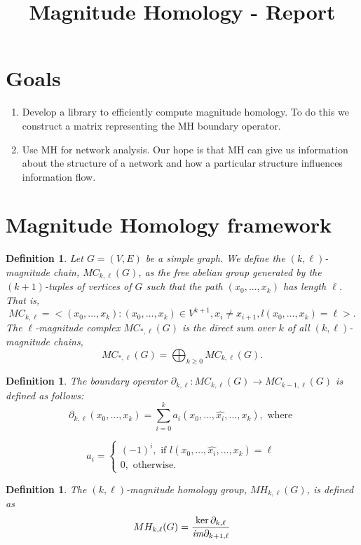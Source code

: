 \documentclass{article}
\title{Magnitude Homology - Report}
\newtheorem{definition}[theorem]{Definition}
\newcommand{\boundary}{\partial_{k,\ell}}
\newcommand{\im}{\emph{im}}
\begin{document}
	
	\maketitle
	
	\section{Goals}
	\begin{enumerate}
		\item Develop a library to efficiently compute magnitude homology. To do this we construct a matrix representing the MH boundary operator.
		\item Use MH for network analysis. Our hope is that MH can give us information about the structure of a network and how a particular structure influences information flow.
	\end{enumerate}
	
	\section{Magnitude Homology framework}
	\begin{definition}
		Let $G=(V,E)$ be a simple graph. We define the \emph{$(k,\ell)$-magnitude chain}, $MC_{k,\ell}(G)$, as the free abelian group generated by the $(k+1)$-tuples of vertices of $G$ such that the path $(x_0,...,x_k)$ has length $\ell$. That is,
		$$
		MC_{k,\ell}=<(x_0,...,x_k): (x_0,...,x_k)\in V^{k+1}, x_i \neq x_{i+1}, l(x_0,...,x_k)=\ell>.
		$$
		The \emph{$\ell$-magnitude complex} $MC_{*,\ell}(G)$ is the direct sum over $k$ of all $(k,\ell)$-magnitude chains,
		$$
		MC_{*,\ell}(G) = \bigoplus_{k\geq 0} MC_{k,\ell}(G).
		$$
	\end{definition}
	
	\begin{definition}
		The boundary operator $\boundary: MC_{k,\ell}(G) \to MC_{k-1,\ell}(G)$ is defined as follows:
		$$
		\boundary(x_0,...,x_k) = \sum_{i=0}^k a_i (x_0,...,\hat{x_i},...,x_k), \text{ where }
		$$
		
		\begin{equation*}
			a_i=\begin{cases} (-1)^i, \text{ if } l(x_0,...,\hat{x_i},...,x_k)=\ell \\
				0, \text{ otherwise.}
			\end{cases}
		\end{equation*}
	\end{definition}
	
	\begin{definition}
		The \emph{$(k,\ell)$-magnitude homology group}, $MH_{k,\ell}(G)$, is defined as
		$$
		MH_{k,\ell}(G) = \frac{\ker \boundary}{\im \partial_{k+1,\ell}}
		$$
	\end{definition}
	
\end{document}

